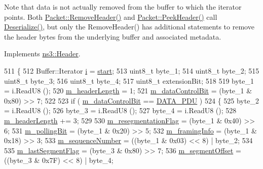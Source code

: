 Note that data is not actually removed from the buffer to which the iterator points. Both \hyperlink{classns3_1_1Packet_a0961eccf975d75f902d40956c93ba63e}{Packet\+::\+Remove\+Header()} and \hyperlink{classns3_1_1Packet_aadc63487bea70945c418f4c3e9b81964}{Packet\+::\+Peek\+Header()} call \hyperlink{classns3_1_1LteRlcAmHeader_abc3714ee128319f59a491a97622c2690}{Deserialize()}, but only the Remove\+Header() has additional statements to remove the header bytes from the underlying buffer and associated metadata. 

Implements \hyperlink{classns3_1_1Header_a78be9400bb66b2a8543606f395ef5396}{ns3\+::\+Header}.


\begin{DoxyCode}
511 \{
512   Buffer::Iterator \hyperlink{bernuolliDistribution_8m_a6f6ccfcf58b31cb6412107d9d5281426}{i} = \hyperlink{namespacevisualizer_1_1core_a2a35e5d8a34af358b508dac8635754e0}{start};
513   uint8\_t byte\_1;
514   uint8\_t byte\_2;
515   uint8\_t byte\_3;
516   uint8\_t byte\_4;
517   uint8\_t extensionBit;
518 
519   byte\_1 = i.ReadU8 ();
520   \hyperlink{classns3_1_1LteRlcAmHeader_a3c565f3b6b45d813ea11f05118898fe8}{m\_headerLength} = 1;
521   \hyperlink{classns3_1_1LteRlcAmHeader_a6931b700f09fba1fd4249b027b6bf5ee}{m\_dataControlBit} = (byte\_1 & 0x80) >> 7;
522 
523   \textcolor{keywordflow}{if} ( \hyperlink{classns3_1_1LteRlcAmHeader_a6931b700f09fba1fd4249b027b6bf5ee}{m\_dataControlBit} == \hyperlink{classns3_1_1LteRlcAmHeader_a7ccc7b1df0021a5e891e02380cd82cd6a42c82aab6e185dae47e6abd252fe75d2}{DATA\_PDU} )
524     \{
525       byte\_2 = i.ReadU8 ();
526       byte\_3 = i.ReadU8 ();
527       byte\_4 = i.ReadU8 ();
528       \hyperlink{classns3_1_1LteRlcAmHeader_a3c565f3b6b45d813ea11f05118898fe8}{m\_headerLength} += 3;
529 
530       \hyperlink{classns3_1_1LteRlcAmHeader_acc84b28a7fb612bd28d1fd4a1646a5ea}{m\_resegmentationFlag} = (byte\_1 & 0x40) >> 6;
531       \hyperlink{classns3_1_1LteRlcAmHeader_ae03d21acce0c756a826079ad9bbd88d6}{m\_pollingBit}         = (byte\_1 & 0x20) >> 5;
532       \hyperlink{classns3_1_1LteRlcAmHeader_ac85a4d100aba414b051cc090b9399c46}{m\_framingInfo}        = (byte\_1 & 0x18) >> 3;
533       \hyperlink{classns3_1_1LteRlcAmHeader_a524ef81f1d7f15e1b19f6487c1d11921}{m\_sequenceNumber}     = ((byte\_1 & 0x03) << 8) | byte\_2;
534 
535       \hyperlink{classns3_1_1LteRlcAmHeader_ae4480cd1d8b06c31c99bdda06c1ebdd7}{m\_lastSegmentFlag}    = (byte\_3 & 0x80) >> 7;
536       \hyperlink{classns3_1_1LteRlcAmHeader_aaab2313fbca4a24854b05767219216f4}{m\_segmentOffset}      = ((byte\_3 & 0x7F) << 8) | byte\_4;

\end{DoxyCode}
